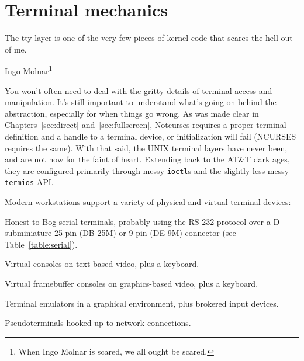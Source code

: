 \section{Terminal mechanics}
\label{section:tty}
\epigraph{The tty layer is one of the very few pieces of kernel code that scares the hell out of me.}{Ingo Molnar\footnote{When Ingo Molnar is scared, we all ought be scared.}\cite{molnarhell}}
You won't often need to deal with the gritty details of terminal access and
manipulation. It's still important to understand what's going on behind the
abstraction, especially for when things go wrong. As was made clear in
Chapters~\ref{sec:direct} and~\ref{sec:fullscreen}, Notcurses requires a
proper terminal definition and a handle to a terminal device, or initialization
will fail (NCURSES requires the same). With that said, the UNIX terminal layers
have never been, and are not now for the faint of heart. Extending back to the
AT\&T dark ages, they are configured primarily through messy \texttt{ioctl}s
and the slightly-less-messy \texttt{termios} API.

Modern workstations support a variety of physical and virtual terminal devices:
\begin{denseitemize}
\item{Honest-to-Bog serial terminals, probably using the RS-232\cite{rs232}
      protocol over a D-subminiature 25-pin (DB-25M) or 9-pin (DE-9M)
      connector (see Table~\ref{table:serial}).}
\item{Virtual consoles on text-based video, plus a keyboard.}
\item{Virtual framebuffer consoles on graphics-based video, plus a keyboard.} 
\item{Terminal emulators in a graphical environment, plus brokered input devices.}
\item{Pseudoterminals hooked up to network connections.}
\end{denseitemize}

